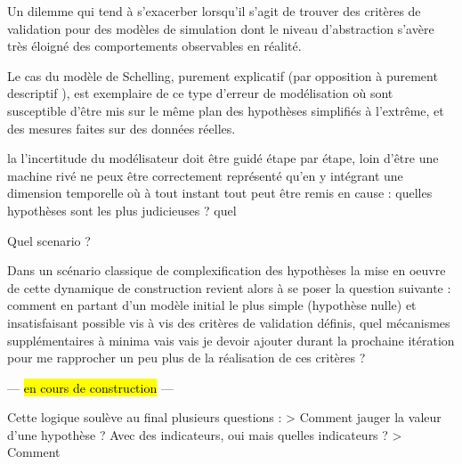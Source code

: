 Un dilemme qui tend à s’exacerber lorsqu'il s'agit de trouver des critères de validation pour des modèles de simulation dont le niveau d'abstraction s'avère très éloigné des comportements observables en réalité.

Le cas du modèle de Schelling, purement explicatif (par opposition à purement descriptif \autocite{Bulle2005}), est exemplaire de ce type d'erreur de modélisation où sont susceptible d'être mis sur le même plan des hypothèses simplifiés à l’extrême, et des mesures faites sur des données réelles.





 la  l'incertitude du modélisateur doit être guidé étape par étape,  loin d'être une machine rivé ne peux être correctement représenté qu'en y intégrant une dimension temporelle où à tout instant tout peut être remis en cause : quelles hypothèses sont les plus judicieuses ? quel

Quel scenario ?

Dans un scénario classique de complexification des hypothèses la mise en oeuvre de cette dynamique de construction revient alors à se poser la question suivante : comment en partant d'un modèle initial le plus simple (hypothèse nulle) et insatisfaisant possible vis à vis des critères de validation définis, quel mécanismes supplémentaires à minima vais vais je devoir ajouter durant la prochaine itération pour me rapprocher un peu plus de la réalisation de ces critères ?




--- \hl{en cours de construction} ---

Cette logique soulève au final plusieurs questions :
> Comment jauger la valeur d'une hypothèse ? Avec des indicateurs, oui mais quelles indicateurs ?
> Comment



